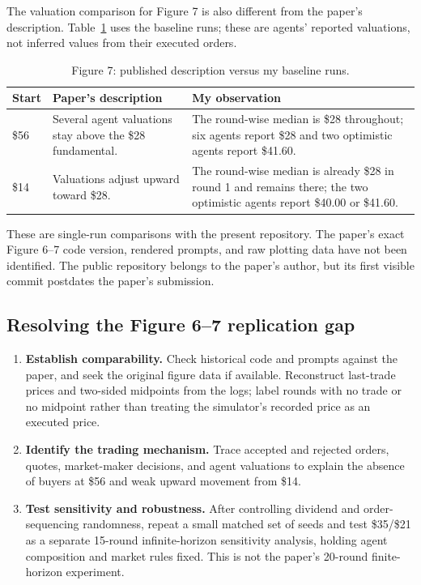 The valuation comparison for Figure 7 is also different from the
paper's description. Table~\ref{tab:my-fig7-results} uses the
baseline runs; these are agents' reported valuations, not inferred
values from their executed orders.

\begin{table}[htbp]
\centering
\small
\caption{Figure 7: published description versus my baseline runs.}
\label{tab:my-fig7-results}
\begin{tabularx}{\textwidth}{@{}lXX@{}}
\toprule
\textbf{Start} & \textbf{Paper's description} & \textbf{My observation} \\
\midrule
\$56 & Several agent valuations stay above the \$28 fundamental. &
The round-wise median is \$28 throughout; six agents report \$28
and two optimistic agents report \$41.60. \\
\$14 & Valuations adjust upward toward \$28. &
The round-wise median is already \$28 in round 1 and remains there;
the two optimistic agents report \$40.00 or \$41.60. \\
\bottomrule
\end{tabularx}
\end{table}

These are single-run comparisons with the present repository. The
paper's exact Figure 6--7 code version, rendered prompts, and raw
plotting data have not been identified. The public repository belongs
to the paper's author, but its first visible commit postdates the
paper's submission.

\subsection*{Resolving the Figure 6--7 replication gap}

\begin{enumerate}
\item \textbf{Establish comparability.} Check historical code and prompts
against the paper, and seek the original figure data if available.
Reconstruct last-trade prices and two-sided midpoints from the logs;
label rounds with no trade or no midpoint rather than treating the
simulator's recorded price as an executed price.

\item \textbf{Identify the trading mechanism.} Trace accepted and
rejected orders, quotes, market-maker decisions, and agent valuations
to explain the absence of buyers at \$56 and weak upward movement
from \$14.

\item \textbf{Test sensitivity and robustness.} After controlling
dividend and order-sequencing randomness, repeat a small matched set
of seeds and test \$35/\$21 as a separate 15-round infinite-horizon
sensitivity analysis, holding agent composition and market rules
fixed. This is not the paper's 20-round finite-horizon experiment.
\end{enumerate}

